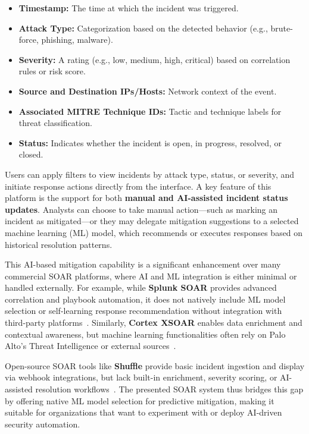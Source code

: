 \begin{itemize}[noitemsep,topsep=0pt]
    \item \textbf{Timestamp:} The time at which the incident was triggered.
    \item \textbf{Attack Type:} Categorization based on the detected behavior (e.g., brute-force, phishing, malware).
    \item \textbf{Severity:} A rating (e.g., low, medium, high, critical) based on correlation rules or risk score.
    \item \textbf{Source and Destination IPs/Hosts:} Network context of the event.
    \item \textbf{Associated MITRE Technique IDs:} Tactic and technique labels for threat classification.
    \item \textbf{Status:} Indicates whether the incident is open, in progress, resolved, or closed.
\end{itemize}

Users can apply filters to view incidents by attack type, status, or severity, and initiate response actions directly from the interface. A key feature of this platform is the support for both \textbf{manual and AI-assisted incident status updates}. Analysts can choose to take manual action—such as marking an incident as mitigated—or they may delegate mitigation suggestions to a selected machine learning (ML) model, which recommends or executes responses based on historical resolution patterns.

This AI-based mitigation capability is a significant enhancement over many commercial SOAR platforms, where AI and ML integration is either minimal or handled externally. For example, while \textbf{Splunk SOAR} provides advanced correlation and playbook automation, it does not natively include ML model selection or self-learning response recommendation without integration with third-party platforms~\cite{splunk}. Similarly, \textbf{Cortex XSOAR} enables data enrichment and contextual awareness, but machine learning functionalities often rely on Palo Alto’s Threat Intelligence or external sources~\cite{paloalto}.

Open-source SOAR tools like \textbf{Shuffle} provide basic incident ingestion and display via webhook integrations, but lack built-in enrichment, severity scoring, or AI-assisted resolution workflows~\cite{techtarget}. The presented SOAR system thus bridges this gap by offering native ML model selection for predictive mitigation, making it suitable for organizations that want to experiment with or deploy AI-driven security automation.

